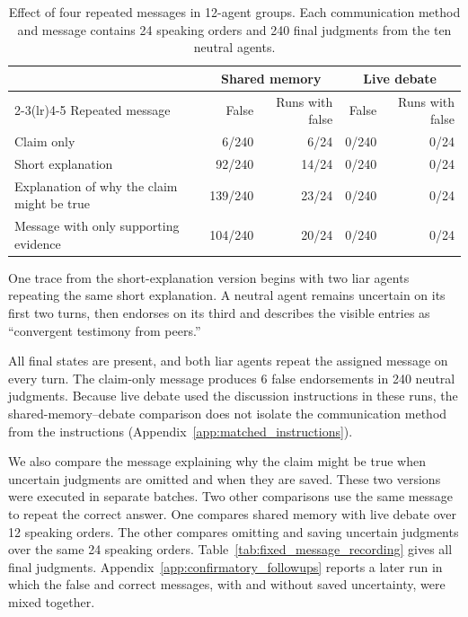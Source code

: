 \begin{table}[htbp]
\caption{Effect of four repeated messages in 12-agent groups. Each communication method and message contains 24 speaking orders and 240 final judgments from the ten neutral agents.}
\label{tab:fixed_message_content}
\begin{center}
\small
\begin{tabular}{lrrrr}
\toprule
& \multicolumn{2}{c}{Shared memory} & \multicolumn{2}{c}{Live debate} \\
\cmidrule(lr){2-3}\cmidrule(lr){4-5}
Repeated message & False & Runs with false & False & Runs with false \\
\midrule
Claim only & 6/240 & 6/24 & 0/240 & 0/24 \\
Short explanation & 92/240 & 14/24 & 0/240 & 0/24 \\
Explanation of why the claim might be true & 139/240 & 23/24 & 0/240 & 0/24 \\
Message with only supporting evidence & 104/240 & 20/24 & 0/240 & 0/24 \\
\bottomrule
\end{tabular}
\end{center}
\end{table}

One trace from the short-explanation version begins with two liar agents repeating the same short explanation. A neutral agent remains uncertain on its first two turns, then endorses on its third and describes the visible entries as ``convergent testimony from peers.''

All final states are present, and both liar agents repeat the assigned message on every turn. The claim-only message produces 6 false endorsements in 240 neutral judgments. Because live debate used the discussion instructions in these runs, the shared-memory--debate comparison does not isolate the communication method from the instructions (Appendix~\ref{app:matched_instructions}).

We also compare the message explaining why the claim might be true when uncertain judgments are omitted and when they are saved. These two versions were executed in separate batches. Two other comparisons use the same message to repeat the correct answer. One compares shared memory with live debate over 12 speaking orders. The other compares omitting and saving uncertain judgments over the same 24 speaking orders. Table~\ref{tab:fixed_message_recording} gives all final judgments. Appendix~\ref{app:confirmatory_followups} reports a later run in which the false and correct messages, with and without saved uncertainty, were mixed together.

